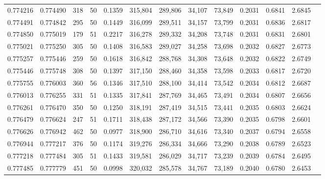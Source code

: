 \begin{tabular}{rrrrrrrrrrrrr}
0.774216 & 0.774490 &   318 &  50 &                                     0.1359 & 315,804 & 289,806 &  34,107 &  73,849 & 0.2031 & 0.6841 & 2.6845 \\
0.774491 & 0.774842 &   295 &  50 &                                     0.1449 & 316,099 & 289,511 &  34,157 &  73,799 & 0.2031 & 0.6836 & 2.6817 \\
0.774850 & 0.775019 &   179 &  51 &                                     0.2217 & 316,278 & 289,332 &  34,208 &  73,748 & 0.2031 & 0.6831 & 2.6801 \\
0.775021 & 0.775250 &   305 &  50 &                                     0.1408 & 316,583 & 289,027 &  34,258 &  73,698 & 0.2032 & 0.6827 & 2.6773 \\
0.775257 & 0.775446 &   259 &  50 &                                     0.1618 & 316,842 & 288,768 &  34,308 &  73,648 & 0.2032 & 0.6822 & 2.6749 \\
0.775446 & 0.775748 &   308 &  50 &                                     0.1397 & 317,150 & 288,460 &  34,358 &  73,598 & 0.2033 & 0.6817 & 2.6720 \\
0.775755 & 0.776003 &   360 &  56 &                                     0.1346 & 317,510 & 288,100 &  34,414 &  73,542 & 0.2034 & 0.6812 & 2.6687 \\
0.776013 & 0.776255 &   331 &  51 &                                     0.1335 & 317,841 & 287,769 &  34,465 &  73,491 & 0.2034 & 0.6807 & 2.6656 \\
0.776261 & 0.776470 &   350 &  50 &                                     0.1250 & 318,191 & 287,419 &  34,515 &  73,441 & 0.2035 & 0.6803 & 2.6624 \\
0.776479 & 0.776624 &   247 &  51 &                                     0.1711 & 318,438 & 287,172 &  34,566 &  73,390 & 0.2035 & 0.6798 & 2.6601 \\
0.776626 & 0.776942 &   462 &  50 &                                     0.0977 & 318,900 & 286,710 &  34,616 &  73,340 & 0.2037 & 0.6794 & 2.6558 \\
0.776944 & 0.777217 &   376 &  50 &                                     0.1174 & 319,276 & 286,334 &  34,666 &  73,290 & 0.2038 & 0.6789 & 2.6523 \\
0.777218 & 0.777484 &   305 &  51 &                                     0.1433 & 319,581 & 286,029 &  34,717 &  73,239 & 0.2039 & 0.6784 & 2.6495 \\
0.777485 & 0.777779 &   451 &  50 &                                     0.0998 & 320,032 & 285,578 &  34,767 &  73,189 & 0.2040 & 0.6780 & 2.6453 \\

\end{tabular}
